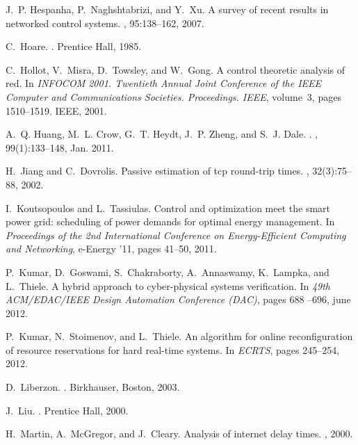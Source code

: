 \documentclass{sig-alternate-ipsn13}
\begin{document}
\begin{thebibliography}{10}
J.~P. Hespanha, P.~Naghshtabrizi, and Y.~Xu.
\newblock A survey of recent results in networked control systems.
, 95:138--162, 2007.

C.~Hoare.
.
\newblock Prentice Hall, 1985.

C.~Hollot, V.~Misra, D.~Towsley, and W.~Gong.
\newblock A control theoretic analysis of red.
\newblock In {\em INFOCOM 2001. Twentieth Annual Joint Conference of the IEEE
  Computer and Communications Societies. Proceedings. IEEE}, volume~3, pages
  1510--1519. IEEE, 2001.

A.~Q. Huang, M.~L. Crow, G.~T. Heydt, J.~P. Zheng, and S.~J. Dale.
.
, 99(1):133--148, Jan. 2011.

H.~Jiang and C.~Dovrolis.
\newblock Passive estimation of tcp round-trip times.
, 32(3):75--88, 2002.

I.~Koutsopoulos and L.~Tassiulas.
\newblock Control and optimization meet the smart power grid: scheduling of
  power demands for optimal energy management.
\newblock In {\em Proceedings of the 2nd International Conference on
  Energy-Efficient Computing and Networking}, e-Energy '11, pages 41--50, 2011.

P.~Kumar, D.~Goswami, S.~Chakraborty, A.~Annaswamy, K.~Lampka, and L.~Thiele.
\newblock A hybrid approach to cyber-physical systems verification.
\newblock In {\em 49th ACM/EDAC/IEEE Design Automation Conference (DAC)}, pages
  688 --696, june 2012.

\newpage

P.~Kumar, N.~Stoimenov, and L.~Thiele.
\newblock An algorithm for online reconfiguration of resource reservations for
  hard real-time systems.
\newblock In {\em ECRTS}, pages 245--254, 2012.

D.~Liberzon.
.
\newblock Birkhauser, Boston, 2003.

J.~Liu.
.
\newblock Prentice Hall, 2000.

H.~Martin, A.~McGregor, and J.~Cleary.
\newblock Analysis of internet delay times.
, 2000.


\end{thebibliography}
\end{document}
